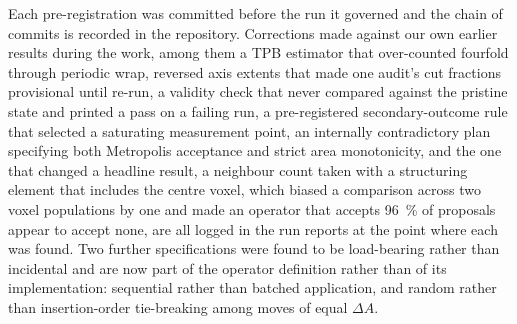 \documentclass[5p,times,twocolumn]{elsarticle}
\begin{document}
Each pre-registration was committed before the run it governed and the chain
of commits is recorded in the repository. Corrections made against our own
earlier results during the work, among them a TPB estimator that over-counted
fourfold
through periodic wrap, reversed axis extents that made one audit's cut
fractions provisional until re-run, a validity check that never compared
against the pristine state and printed a pass on a failing run, a
pre-registered secondary-outcome rule that selected a saturating measurement
point, an internally contradictory plan specifying both Metropolis acceptance
and strict area monotonicity, and the one that changed a headline result, a
neighbour count taken with a structuring element that includes the
centre voxel, which biased a comparison across two voxel populations by one and
made an operator that accepts \SI{96}{\percent} of proposals appear to accept
none, are all logged in the run reports at the point where each was found. Two
further specifications were found to be load-bearing rather than incidental
and are now part of the operator definition rather than of its implementation:
sequential rather than batched application, and random rather than
insertion-order tie-breaking among moves of equal $\Delta A$.
\endgroup
\end{document}
